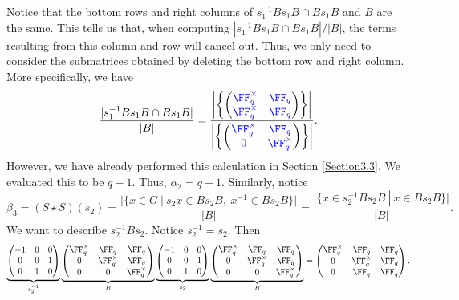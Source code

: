 \documentclass[11pt]{amsart}
\theoremstyle{remark}
\begin{document}
Notice that the bottom rows and right columns of $s_1^{-1}Bs_1B\cap Bs_1B$ and $B$ are the same.
This tells us that, when computing $|s_1^{-1}Bs_1B\cap Bs_1B|/|B|$, the terms resulting from this column and row will cancel out.
Thus, we only need to consider the submatrices obtained by deleting the bottom row and right column.
More specifically, we have
\[
	\frac{|s_1^{-1}Bs_1B\cap Bs_1B|}{|B|} = \frac{\left|\left\{\begin{pmatrix}\color{blue}\FF_q^\times & \color{blue}\FF_q \\ \color{blue}\FF_q^\times & \color{blue}\FF_q \end{pmatrix}\right\}\right|}{\left|\left\{\begin{pmatrix} \color{blue}\FF_q^\times & \color{blue}\FF_q \\ \color{blue}0 & \color{blue}\FF_q^\times \end{pmatrix}\right\}\right|}.
\]
However, we have already performed this calculation in Section \ref{Section3.3}.
We evaluated this to be $q-1$.
Thus, $\alpha_2 = q-1$.
Similarly, notice
\[
	\beta_3 = (S\star S)(s_2) = \frac{|\{x\in G\ |\ s_2x\in Bs_2B,\ x^{-1}\in Bs_2B\}|}{|B|} = \frac{|\{x\in s_2^{-1}Bs_2B\ |\ x\in Bs_2B\}|}{|B|}.
\]
We want to describe $s_2^{-1}Bs_2$.
Notice $s_2^{-1}=s_2$.
Then
\[
	\underbrace{\begin{pmatrix}
			-1 & 0 & 0 \\
			0  & 0 & 1 \\
			0  & 1 & 0
		\end{pmatrix}}_{s_2^{-1}}
	\underbrace{\begin{pmatrix}
			\FF_q^\times & \FF_q        & \FF_q        \\
			0            & \FF_q^\times & \FF_q        \\
			0            & 0            & \FF_q^\times
		\end{pmatrix}}_{B}
	\underbrace{\begin{pmatrix}
			-1 & 0 & 0 \\
			0  & 0 & 1 \\
			0  & 1 & 0
		\end{pmatrix}}_{s_2}
	\underbrace{\begin{pmatrix}
			\FF_q^\times & \FF_q        & \FF_q        \\
			0            & \FF_q^\times & \FF_q        \\
			0            & 0            & \FF_q^\times
		\end{pmatrix}}_{B} =
	\begin{pmatrix}
		\FF_q^\times & \FF_q        & \FF_q \\
		0            & \FF_q^\times & \FF_q \\
		0            & \FF_q        & \FF_q
	\end{pmatrix}.
\]
\end{document}
